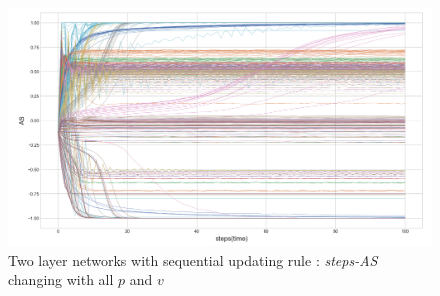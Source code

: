 \documentclass[review]{elsarticle}
\begin{document}
\begin{figure}[!htb]
	\centering
	\includegraphics[width=\hsize]{timeflow_AS.png}
	\caption{Two layer networks with sequential updating rule : \textit{steps-AS} changing with all $p$ and $v$}
	\label{timeflow_AS}
\end{figure}
\end{document}

